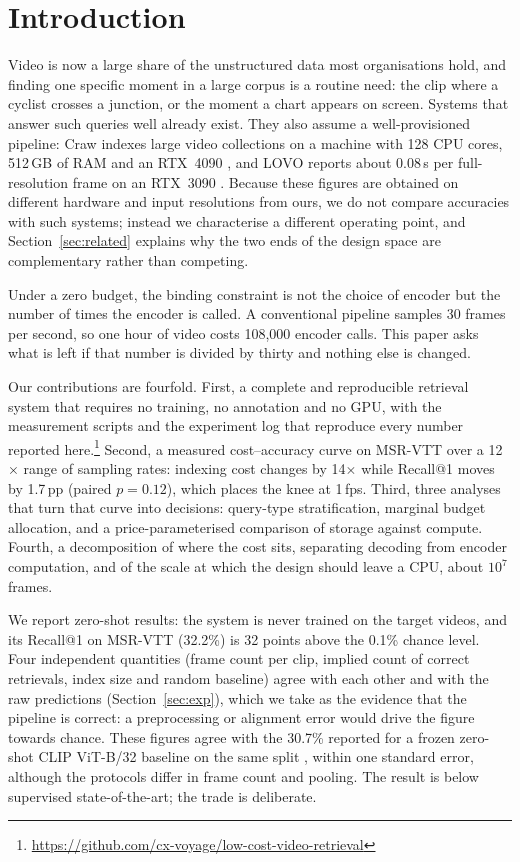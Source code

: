 \documentclass[journal]{IEEEtran}
\begin{document}
\section{Introduction}

Video is now a large share of the unstructured data most organisations hold, and
finding one specific moment in a large corpus is a routine need: the clip where a cyclist
crosses a junction, or the moment a chart appears on screen. Systems that answer such
queries well already exist. They also assume a well-provisioned pipeline: Craw indexes
large video collections on a machine with 128 CPU cores, 512\,GB of RAM and an RTX~4090
\cite{craw2026}, and LOVO reports about 0.08\,s per full-resolution frame on an RTX~3090
\cite{lovo2025}. Because these figures are obtained on different hardware and input
resolutions from ours, we do not compare accuracies with such systems; instead we characterise
a different operating point, and Section~\ref{sec:related} explains why the two ends of the
design space are complementary rather than competing.

Under a zero budget, the binding constraint is not the choice of encoder but the number of
times the encoder is called. A conventional pipeline samples 30 frames per second, so one
hour of video costs 108{,}000 encoder calls. This paper asks what is left if that number is
divided by thirty and nothing else is changed.

Our contributions are fourfold. First, a complete and reproducible retrieval system that
requires no training, no annotation and no GPU, with the measurement scripts and the experiment log
that reproduce every number reported here.\footnote{\url{https://github.com/cx-voyage/low-cost-video-retrieval}}
Second, a measured cost--accuracy curve on MSR-VTT over a 12$\times$ range of sampling rates:
indexing cost changes by 14$\times$ while Recall@1 moves by 1.7\,pp (paired $p=0.12$), which
places the knee at 1\,fps. Third, three analyses that turn that curve into decisions:
query-type stratification, marginal budget allocation, and a price-parameterised comparison of
storage against compute. Fourth, a decomposition of where the cost sits, separating decoding from
encoder computation, and of the scale at which the design should leave a CPU, about
$10^{7}$ frames.

We report zero-shot results: the system is never trained on the target videos, and its Recall@1
on MSR-VTT (32.2\%) is 32 points above the 0.1\% chance level. Four independent quantities (frame count per clip, implied count of correct retrievals, index size and random baseline) agree with
each other and with the raw predictions (Section~\ref{sec:exp}), which we take as the evidence
that the pipeline is correct: a preprocessing or alignment error would drive the figure towards
chance. These figures agree with the 30.7\% reported for a frozen zero-shot CLIP ViT-B/32 baseline
on the same split \cite{ventura2024learning}, within one standard error, although the protocols
differ in frame count and pooling. The
result is below supervised state-of-the-art; the trade is deliberate.
\end{document}
